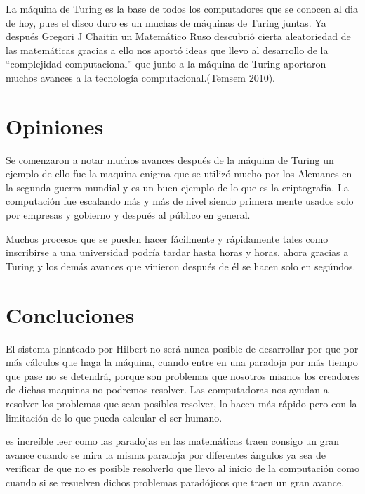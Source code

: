 \documentclass{article}
\begin{document}
\vspace{10pt}
La máquina de Turing es la base de todos los computadores que se conocen al dia de hoy, pues el disco duro es un muchas de máquinas de Turing juntas.
Ya después Gregori J Chaitin un Matemático Ruso descubrió cierta aleatoriedad de las matemáticas gracias a ello nos aportó ideas que llevo al desarrollo de la “complejidad computacional” que junto a la máquina de Turing aportaron muchos avances a la tecnología computacional.(Temsem 2010).
\section{Opiniones}
Se comenzaron a notar muchos avances después de la máquina de Turing un ejemplo de ello fue la maquina enigma que se utilizó mucho por los Alemanes en la segunda guerra mundial y es un buen ejemplo de lo que es la criptografía. La computación fue escalando más y más de nivel siendo primera mente usados solo por empresas y gobierno y después al público en general.
\vspace{10pt}

Muchos procesos que se pueden hacer fácilmente y rápidamente tales como inscribirse a una universidad podría tardar hasta horas y horas, ahora gracias a Turing y los demás avances que vinieron después de él se hacen solo en segúndos.

\section{Concluciones}

El sistema planteado por Hilbert no será nunca posible de desarrollar  por que por más cálculos que haga la máquina, cuando entre en una paradoja por más tiempo que pase no se detendrá, porque son problemas que nosotros mismos los creadores de dichas maquinas no podremos resolver. Las computadoras nos ayudan a resolver los problemas que sean posibles resolver, lo hacen más rápido pero con la limitación de lo que pueda calcular el ser humano.

\vspace{10pt}

es increíble leer como las paradojas en las matemáticas traen consigo un gran avance cuando se mira la misma paradoja por diferentes ángulos ya sea de verificar de que no es posible resolverlo que llevo al inicio de la computación como cuando si se resuelven dichos problemas paradójicos  que traen un gran avance. 

\vspace{10pt}
\end{document}
